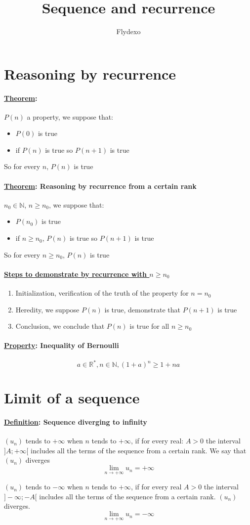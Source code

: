 \documentclass{article}
\title{Sequence and recurrence}
\author{Flydexo}
\newcommand{\definition}[1]{\paragraph*{\underline{Definition}: #1}}
\newcommand{\property}[1]{\paragraph*{\underline{Property}: #1}}
\newcommand{\theorem}[1]{\paragraph*{\underline{Theorem}: #1}}
\begin{document}
\maketitle
\tableofcontents
\section{Reasoning by recurrence}
\theorem{}
$P(n)$ a property, we suppose that:
\begin{itemize}
    \item $P(0)$ is true
    \item if $P(n)$ is true so $P(n+1)$ is true
\end{itemize}
So for every $n$, $P(n)$ is true
\theorem{Reasoning by recurrence from a certain rank}
$n_0 \in \mathbb{N}$, $n \ge n_0$, we suppose that:
\begin{itemize}
    \item $P(n_0)$ is true
    \item if $n \ge n_0$, $P(n)$ is true so $P(n+1)$ is true
\end{itemize}
So for every $n \ge n_0$, $P(n)$ is true
\paragraph{\underline{Steps to demonstrate by recurrence with $n \ge n_0$}}
\begin{enumerate}
    \item Initialization, verification of the truth of the property for $n=n_0$
    \item Heredity, we suppose $P(n)$ is true, demonstrate that $P(n+1)$ is true
    \item Conclusion, we conclude that $P(n)$ is true for all $n \ge n_0$
\end{enumerate}
\property{Inequality of Bernoulli}
$$a \in \mathbb{R}^*, n \in \mathbb{N}, (1+a)^n \ge 1+na$$
\section{Limit of a sequence}
\definition{Sequence diverging to infinity}
$(u_n)$ tends to $+\infty$ when $n$ tends to $+\infty$, if for every real:
$A>0$ the interval $]A;+\infty[$ includes all the terms of the sequence from a certain rank. We say that $(u_n)$ diverges $$\lim_{n \to +\infty} u_n = +\infty$$

$(u_n)$ tends to $-\infty$ when $n$ tends to $+\infty$, if for every real $A > 0$ the interval $]-\infty;-A[$ includes all the terms of the sequence from a certain rank. $(u_n)$ diverges. $$\lim_{n \to +\infty} u_n = -\infty$$
\end{document}
